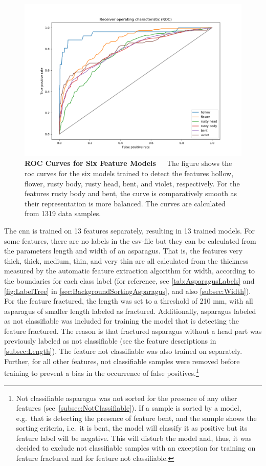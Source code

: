 \begin{figure}[!htb]
	\centering
	\includegraphics[scale=0.6]{Figures/chapter04/singellabelROC.png}
	\decoRule
	\caption[Single-Label CNN ROC Curve]{\textbf{ROC Curves for Six Feature Models}~~~The figure shows the \acrshort{roc} curves for the six models trained to detect the features hollow, flower, rusty body, rusty head, bent, and violet, respectively. For the features rusty body and bent, the curve is comparatively smooth as their representation is more balanced. The curves are calculated from 1319 data samples.}
	\label{fig:SingleLabelROC}
\end{figure}

The \acrshort{cnn} is trained on 13 features separately, resulting in 13 trained models. For some features, there are no labels in the csv-file but they can be calculated from the parameters length and width of an asparagus. That is, the features very thick, thick, medium, thin, and very thin are all calculated from the thickness measured by the automatic feature extraction algorithm for width, according to the boundaries for each class label (for reference, see \autoref{tab:AsparagusLabels} and \autoref{fig:LabelTree} in \autoref{sec:BackgroundSortingAsparagus}, and also \autoref{subsec:Width}). For the feature fractured, the length was set to a threshold of 210 mm, with all asparagus of smaller length labeled as fractured. Additionally, asparagus labeled as not classifiable was included for training the model that is detecting the feature fractured. The reason is that fractured asparagus without a head part was previously labeled as not classifiable (see the feature descriptions in \autoref{subsec:Length}). The feature not classifiable was also trained on separately. Further, for all other features, not classifiable samples were removed before training to prevent a bias in the occurrence of false positives.\footnote{Not classifiable asparagus was not sorted for the presence of any other features (see~\autoref{subsec:NotClassifiable}). If a sample is sorted by a model, e.g.\ that is detecting the presence of feature bent, and the sample shows the sorting criteria, i.e.\ it is bent, the model will classify it as positive but its feature label will be negative. This will disturb the model and, thus, it was decided to exclude not classifiable samples with an exception for training on feature fractured and for feature not classifiable.}

